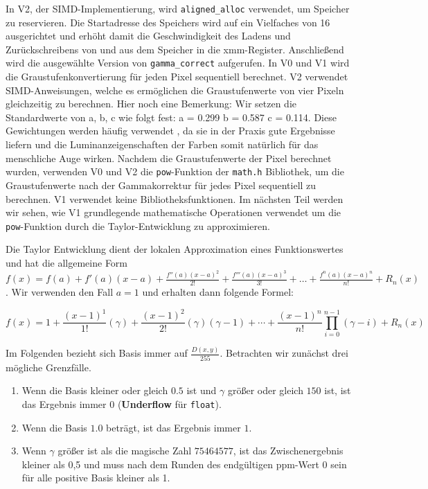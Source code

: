\documentclass[course=erap]{aspdoc}
\begin{document}
\par
In V2, der SIMD-Implementierung, wird \texttt{aligned\_alloc} \cite{man2022aligned_alloc} verwendet, um Speicher zu reservieren. Die Startadresse des Speichers wird auf ein Vielfaches von 16 ausgerichtet und erhöht damit die Geschwindigkeit des Ladens und Zurückschreibens von und aus dem Speicher in die xmm-Register. Anschließend wird die ausgewählte Version von \texttt{gamma\_correct} aufgerufen. In V0 und V1 wird die Graustufenkonvertierung für jeden Pixel sequentiell berechnet. V2 verwendet SIMD-Anweisungen, welche es ermöglichen die Graustufenwerte von vier Pixeln gleichzeitig zu berechnen. Hier noch eine Bemerkung: Wir setzen die Standardwerte von a, b, c wie folgt fest: a = 0.299 b = 0.587 c = 0.114. Diese Gewichtungen werden häufig verwendet \cite{w3c1996sRGB}, da sie in der Praxis gute Ergebnisse liefern und die Luminanzeigenschaften der Farben somit natürlich für das menschliche Auge wirken. Nachdem die Graustufenwerte der Pixel berechnet wurden, verwenden V0 und V2 die \texttt{pow}-Funktion der \texttt{math.h} Bibliothek, um die Graustufenwerte nach der Gammakorrektur für jedes Pixel sequentiell zu berechnen. V1 verwendet keine Bibliotheksfunktionen. Im nächsten Teil werden wir sehen, wie V1 grundlegende mathematische Operationen verwendet um die \texttt{pow}-Funktion durch die Taylor-Entwicklung zu approximieren.

\par
Die Taylor Entwicklung \cite{mathworld2024taylorseries} dient der lokalen Approximation eines Funktionswertes und hat die allgemeine Form $f(x) = f(a) + f'(a)(x-a) + \frac{{f''(a)(x-a)^2}}{2!} + \frac{{f'''(a)(x-a)^3}}{3!} + \ldots + \frac{{f^n(a)(x-a)^n}}{n!} + R_n(x) $. Wir verwenden den Fall $a = 1$ und erhalten dann folgende Formel:

\begin{equation}
f(x) = 1 + \frac{(x-1)^1}{1!} (\gamma) + \frac{(x-1)^2}{2!} (\gamma)(\gamma-1)  + \cdots + \frac{(x-1)^n}{n!} \prod_{i=0}^{n-1} (\gamma-i) + R_n(x)
\end{equation}

\par
Im Folgenden bezieht sich Basis immer auf $\frac{D(x, y)}{255}$. Betrachten wir zunächst drei mögliche Grenzfälle. 
\begin{enumerate}
\item Wenn die Basis kleiner oder gleich \(0.5\) ist und $\gamma$ größer oder gleich \(150\) ist, ist das Ergebnis immer \(0\) (\textbf{Underflow} für \texttt{float}).
\item Wenn die Basis \(1.0\) beträgt, ist das Ergebnis immer \(1\).
\item Wenn $\gamma$ größer ist als die magische Zahl \(75464577\),  ist das Zwischenergebnis kleiner als 0,5 und muss nach dem Runden des endgültigen ppm-Wert 0 sein für alle positive Basis kleiner als 1.
\end{enumerate}
\end{document}
